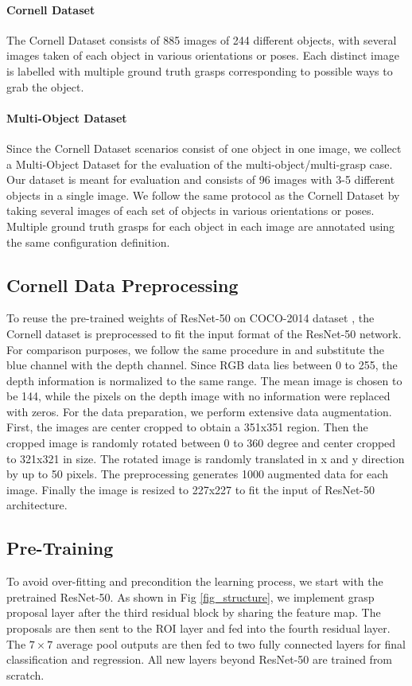 \documentclass[letterpaper, 10 pt, journal, twoside]{IEEEtran}
\begin{document}
\paragraph{Cornell Dataset}
The Cornell Dataset \cite{cornell2013} consists of 885 images of 244
different objects, with several images taken of each object in various
orientations or poses. Each distinct image is labelled with multiple
ground truth grasps corresponding to possible ways to grab the object. 


\paragraph{Multi-Object Dataset}
Since the Cornell Dataset scenarios consist of one object in one image,
we collect a Multi-Object Dataset for the evaluation of the
multi-object/multi-grasp case. Our dataset is meant for evaluation and
consists of 96 images with 3-5 different objects in a single image. We
follow the same protocol as the Cornell Dataset by taking several images of
each set of objects in various orientations or poses. Multiple ground truth
grasps for each object in each image are annotated using the same
configuration definition.


\subsection{Cornell Data Preprocessing}
To reuse the pre-trained weights of ResNet-50 on COCO-2014 dataset
\cite{lin2014microsoft}, the Cornell dataset is preprocessed to fit the
input format of the ResNet-50 network. For comparison purposes, we follow
the same procedure in \cite{redmon2015real} and substitute the blue channel 
with the depth channel.  Since RGB data lies between 0 to 255, the depth
information is normalized to the same range.  The mean image is chosen
to be 144, while the pixels on the depth image with no information were
replaced with zeros.  For the data preparation, we perform extensive data
augmentation. First, the images are center cropped to obtain a 351x351
region. Then the cropped image is randomly rotated between 0 to 360
degree and center cropped to 321x321 in size.  The rotated image is
randomly translated in x and y direction by up to 50 pixels. The
preprocessing generates 1000 augmented data for each image. Finally the
image is resized to 227x227 to fit the input of ResNet-50 architecture.       


\subsection{Pre-Training}
To avoid over-fitting and precondition the learning process,  we start
with the pretrained ResNet-50. As shown in Fig \ref{fig_structure}, we
implement grasp proposal layer after the third residual block by sharing
the feature map. The proposals are then sent to the ROI layer and fed into
the fourth residual layer. The $7\times7$ average pool outputs are then
fed to two fully connected layers for final classification and
regression. All new layers beyond ResNet-50 are trained from scratch. 
\end{document}
